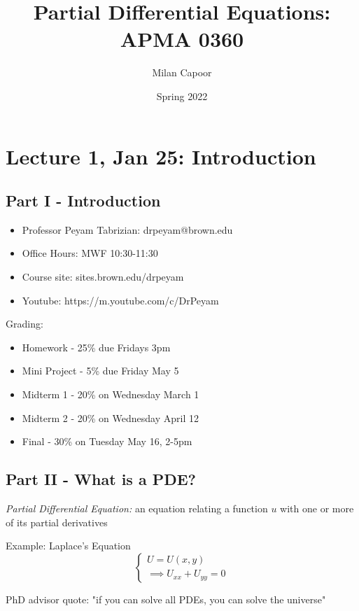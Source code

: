 \documentclass[12pt]{article}
\title{Partial Differential Equations: APMA 0360}
\author{Milan Capoor}
\date{Spring 2022}
\begin{document}
\maketitle
\section*{Lecture 1, Jan 25: Introduction}
\subsection*{Part I - Introduction}

\begin{itemize}
    \item Professor Peyam Tabrizian: drpeyam@brown.edu
    \item Office Hours: MWF 10:30-11:30
    \item Course site: sites.brown.edu/drpeyam
    \item Youtube: https://m.youtube.com/c/DrPeyam
\end{itemize}

Grading:
\begin{itemize}
    \item Homework - 25\% due Fridays 3pm
    \item Mini Project - 5\% due Friday May 5
    \item Midterm 1 - 20\% on Wednesday March 1
    \item Midterm 2 - 20\% on Wednesday April 12
    \item Final - 30\% on Tuesday May 16, 2-5pm 
\end{itemize}

\subsection*{Part II - What is a PDE?}
\emph{Partial Differential Equation:} an equation relating a function $u$ with one or more of its partial derivatives

Example: Laplace's Equation
\[\begin{cases}
    U = U(x, y)\\
    \implies U_{xx} + U_{yy} = 0
\end{cases}\]

PhD advisor quote: "if you can solve all PDEs, you can solve the universe"
\end{document}
